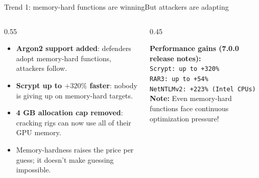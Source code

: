 \ifdefined\PRESENTATION\else\PassOptionsToClass{handout}{beamer}\fi\documentclass[aspectratio=169, lualatex]{beamer}
\begin{document}
\begin{frame}{Trend 1: memory-hard functions are winning}{But attackers are adapting}
	\begin{columns}[c]
		\begin{column}{0.55\textwidth}
			\begin{itemize}
				\item \textbf{Argon2 support added}: defenders adopt memory-hard functions, attackers follow.
				\item \textbf{Scrypt up to $+320\%$ faster}: nobody is giving up on memory-hard targets.
				\item \textbf{4 GB allocation cap removed}: cracking rigs can now use all of their GPU memory.
				\item Memory-hardness raises the price per guess; it doesn't make guessing impossible.
			\end{itemize}
		\end{column}
		\begin{column}{0.45\textwidth}
			\begin{tcolorbox}[colback=black!5!white,colframe=ciphergray]
				\textbf{Performance gains (7.0.0 release notes):}\\
				\texttt{Scrypt: up to +320\%}\\
				\texttt{RAR3: up to +54\%}\\
				\texttt{NetNTLMv2: +223\% (Intel CPUs)}\\[0.5em]
				\textcolor{cipherprimary}{\textbf{Note:} \small Even memory-hard functions face continuous optimization pressure!}
			\end{tcolorbox}
		\end{column}
	\end{columns}
\end{frame}
\end{document}
